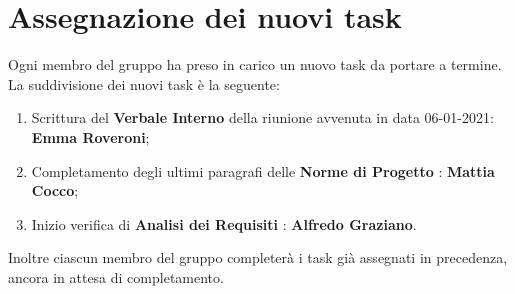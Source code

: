 	\section{Assegnazione dei nuovi task}
	Ogni membro del gruppo ha preso in carico un nuovo task da portare a termine. La suddivisione dei nuovi task è la seguente:
	\begin{enumerate}
		\item Scrittura del \textbf{Verbale Interno} della riunione avvenuta in data 06-01-2021: \textbf{Emma Roveroni};
		\item Completamento degli ultimi paragrafi delle \textbf{Norme di Progetto} : \textbf{Mattia Cocco};
		\item Inizio verifica di \textbf{Analisi dei Requisiti} : \textbf{Alfredo Graziano}.
	\end{enumerate}
	Inoltre ciascun membro del gruppo completerà i task già assegnati in precedenza, ancora in attesa di completamento.
